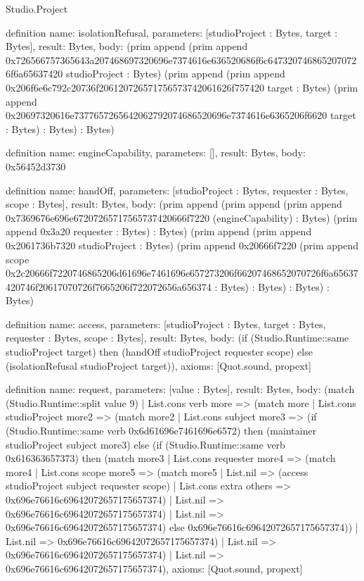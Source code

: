 \begin{lexlean}{Studio.Project}
\begin{semanticmodule}
definition{
  name: isolationRefusal,
  parameters: [studioProject : Bytes, target : Bytes],
  result: Bytes,
  body: (prim append (prim append 0x726566757365643a207468697320696e7374616e636520686f6c6473207468652070726f6a65637420 studioProject : Bytes) (prim append (prim append 0x206f6e6c792c20736f206120726571756573742061626f757420 target : Bytes) (prim append 0x20697320616e7377657265642062792074686520696e7374616e6365206f6620 target : Bytes) : Bytes) : Bytes)
}

definition{
  name: engineCapability,
  parameters: [],
  result: Bytes,
  body: 0x56452d3730
}

definition{
  name: handOff,
  parameters: [studioProject : Bytes, requester : Bytes, scope : Bytes],
  result: Bytes,
  body: (prim append (prim append (prim append 0x7369676e696e67207265717565737420666f7220 (engineCapability) : Bytes) (prim append 0x3a20 requester : Bytes) : Bytes) (prim append (prim append 0x2061736b7320 studioProject : Bytes) (prim append 0x20666f7220 (prim append scope 0x2c20666f7220746865206d61696e7461696e657273206f66207468652070726f6a65637420746f20617070726f7665206f722072656a656374 : Bytes) : Bytes) : Bytes) : Bytes)
}

definition{
  name: access,
  parameters: [studioProject : Bytes, target : Bytes, requester : Bytes, scope : Bytes],
  result: Bytes,
  body: (if (Studio.Runtime::same studioProject target) then (handOff studioProject requester scope) else (isolationRefusal studioProject target)),
  axioms: [Quot.sound, propext]
}

definition{
  name: request,
  parameters: [value : Bytes],
  result: Bytes,
  body: (match (Studio.Runtime::split value 9)
    | List.cons verb more => (match more
      | List.cons studioProject more2 => (match more2
        | List.cons subject more3 => (if (Studio.Runtime::same verb 0x6d61696e7461696e6572) then (maintainer studioProject subject more3) else (if (Studio.Runtime::same verb 0x616363657373) then (match more3
          | List.cons requester more4 => (match more4
            | List.cons scope more5 => (match more5
              | List.nil => (access studioProject subject requester scope)
              | List.cons extra others => 0x696e76616c69642072657175657374)
            | List.nil => 0x696e76616c69642072657175657374)
          | List.nil => 0x696e76616c69642072657175657374) else 0x696e76616c69642072657175657374))
        | List.nil => 0x696e76616c69642072657175657374)
      | List.nil => 0x696e76616c69642072657175657374)
    | List.nil => 0x696e76616c69642072657175657374),
  axioms: [Quot.sound, propext]
}


\end{semanticmodule}
\end{lexlean}
